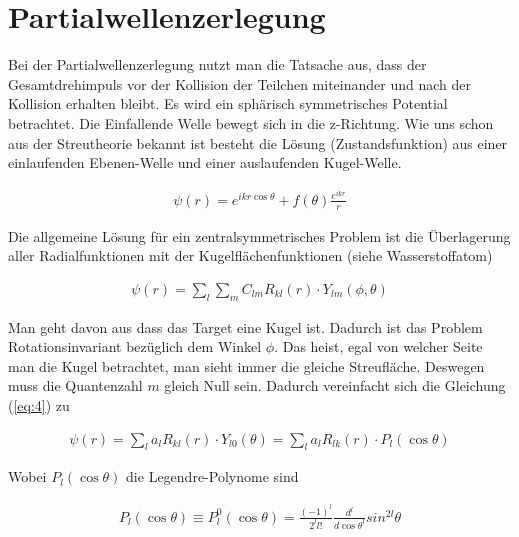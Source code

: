 
\usepackage{amsmath}                %
\usepackage{amsfonts}



\section*{Partialwellenzerlegung}

Bei der Partialwellenzerlegung nutzt man die Tatsache aus, dass der Gesamtdrehimpuls vor der Kollision der Teilchen miteinander und nach der Kollision erhalten bleibt. Es wird ein sphärisch symmetrisches Potential betrachtet. Die Einfallende Welle bewegt sich in die z-Richtung. Wie uns schon aus der Streutheorie bekannt ist besteht die Lösung (Zustandsfunktion) aus einer einlaufenden Ebenen-Welle und einer auslaufenden Kugel-Welle. 

\begin{align}
  \label{eq:1}
  \psi(r) = e^{ikr\cos\theta} + f(\theta)\frac{e^{i k r}}{r}
\end{align}

Die allgemeine Lösung für ein zentralsymmetrisches Problem ist die Überlagerung aller Radialfunktionen mit der Kugelflächenfunktionen (siehe Wasserstoffatom)

\begin{align}
  \label{eq:4}
  \psi(r) = \sum_l\sum_m C_{lm} R_{kl}(r)\cdot Y_{lm}(\phi,\theta) 
\end{align}

Man geht davon aus dass das Target eine Kugel ist. Dadurch ist das Problem Rotationsinvariant bezüglich dem Winkel \(\phi\). Das heist, egal von welcher Seite man die Kugel betrachtet, man sieht immer die gleiche Streufläche. Deswegen muss die Quantenzahl \(m\) gleich Null sein. Dadurch vereinfacht sich die Gleichung (\ref{eq:4}) zu

\begin{align}
  \label{eq:5}
    \psi(r) = \sum_l a_{l} R_{kl}(r)\cdot Y_{l0}(\theta) = \sum_l a_{l} R_{lk}(r)\cdot P_{l}(\cos\theta)
\end{align}

Wobei \(P_{l}(\cos\theta)\) die Legendre-Polynome sind

\begin{align}
  \label{eq:6}
  P_{l}(\cos\theta) \equiv P_{l}^0(\cos\theta) = \frac{(-1)^l}{2^l l!}\frac{d^l}{d \cos\theta^l}sin^{2l}\theta
\end{align}

